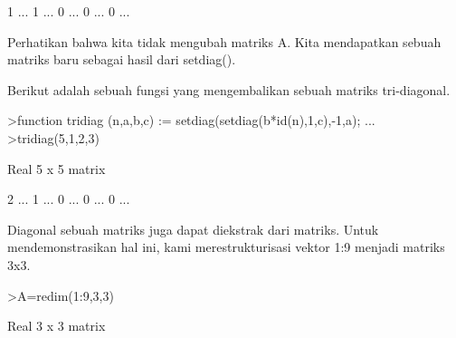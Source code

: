 \documentclass[a4paper,10pt]{article}
\begin{document}
\begin{eulernotebook}
\begin{eulercomment}
\begin{eulercomment}
\begin{eulercomment}
\begin{eulercomment}
\begin{eulercomment}
\begin{eulercomment}
\begin{euleroutput}
                        1     ...
                        1     ...
                        0     ...
                        0     ...
                        0     ...
\end{euleroutput}
\begin{eulercomment}
Perhatikan bahwa kita tidak mengubah matriks A. Kita mendapatkan
sebuah matriks baru sebagai hasil dari setdiag().

Berikut adalah sebuah fungsi yang mengembalikan sebuah matriks
tri-diagonal.
\end{eulercomment}
\begin{eulerprompt}
>function tridiag (n,a,b,c) := setdiag(setdiag(b*id(n),1,c),-1,a); ...
>tridiag(5,1,2,3)
\end{eulerprompt}
\begin{euleroutput}
  Real 5 x 5 matrix
  
                        2     ...
                        1     ...
                        0     ...
                        0     ...
                        0     ...
\end{euleroutput}
\begin{eulercomment}
Diagonal sebuah matriks juga dapat diekstrak dari matriks. Untuk
mendemonstrasikan hal ini, kami merestrukturisasi vektor 1:9 menjadi
matriks 3x3.
\end{eulercomment}
\begin{eulerprompt}
>A=redim(1:9,3,3)
\end{eulerprompt}
\begin{euleroutput}
  Real 3 x 3 matrix
  

\end{euleroutput}
\end{eulercomment}
\end{eulercomment}
\end{eulercomment}
\end{eulercomment}
\end{eulercomment}
\end{eulercomment}
\end{eulernotebook}
\end{document}
